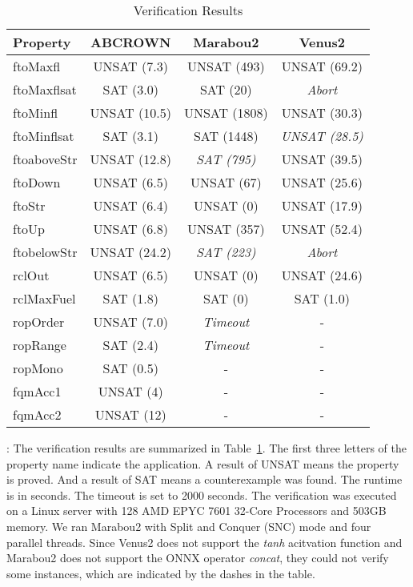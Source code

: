 \begin{table} [htb]
	\centering
  	\caption{Verification Results} \label{tab:results}
	\begin{tabular}{|l | c| c| c|}
		\hline
		Property & ABCROWN  & Marabou2  & Venus2 \\
		\hline
		ftoMaxfl 		& UNSAT (7.3)  	& UNSAT (493) 	& UNSAT (69.2)   \\
		\hline
		ftoMaxflsat 	& SAT (3.0) 		& SAT (20) 		& \emph{Abort} \\
		\hline
		ftoMinfl 		& UNSAT (10.5) 	& UNSAT (1808) 	& UNSAT (30.3)  \\
		\hline
		ftoMinflsat 	& SAT (3.1) 		& SAT (1448) 		& \emph{UNSAT (28.5)} \\
		\hline
		ftoaboveStr 	& UNSAT (12.8) 	&\emph{SAT (795)}		& UNSAT (39.5)\\
		\hline
		ftoDown 		& UNSAT (6.5) 	& UNSAT (67) 		& UNSAT (25.6) \\
		\hline
		ftoStr 	& UNSAT (6.4) 	& UNSAT (0) 		& UNSAT (17.9) \\
		\hline
		ftoUp 			& UNSAT (6.8) 	& UNSAT (357) 	& UNSAT (52.4)  \\
		\hline
		ftobelowStr 	& UNSAT (24.2) 	& \emph{SAT (223)} 		&\emph{Abort} \\
		\hline
		rclOut 	& UNSAT (6.5) 	& UNSAT (0) 		& UNSAT (24.6) \\
		\hline
		rclMaxFuel 	& SAT (1.8) 		& SAT (0) 		& SAT (1.0) \\
		\hline
		ropOrder 		& UNSAT (7.0) 	& \emph{Timeout} 			& - \\
		\hline
		ropRange 		& SAT (2.4) 		& \emph{Timeout} 			& - \\
		\hline
		ropMono 		& SAT (0.5) 		& - 						& - \\
		\hline
		fqmAcc1 		& UNSAT (4) 		& - 						& - \\
		\hline
		fqmAcc2 		& UNSAT (12) 		& - 						& - \\
		\hline
	\end{tabular}
\end{table}

: The verification results are summarized in Table~\ref{tab:results}. The first three letters of the property name indicate the application.
A result of UNSAT means the property is proved. And a result of SAT means a counterexample was found. The runtime is in seconds. The timeout is set to 2000 seconds.
The verification was executed on a Linux server with 128 AMD EPYC 7601 32-Core Processors and 503GB memory. We ran Marabou2 with Split and Conquer (SNC) mode and four parallel threads. 
Since Venus2 does not support the \emph{tanh} acitvation function and Marabou2 does not support the ONNX operator \emph{concat}, they could not verify some instances, which are indicated by the dashes in the table.

